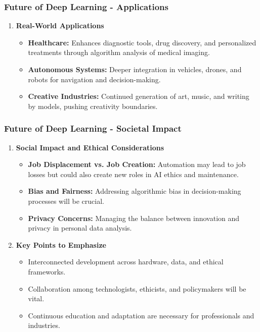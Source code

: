 \documentclass[aspectratio=169]{beamer}
\begin{document}
\begin{frame}[fragile]
    \frametitle{Future of Deep Learning - Applications}
    \begin{enumerate}[resume]
        \item \textbf{Real-World Applications}
            \begin{itemize}
                \item \textbf{Healthcare:} Enhances diagnostic tools, drug discovery, and personalized treatments through algorithm analysis of medical imaging.
                \item \textbf{Autonomous Systems:} Deeper integration in vehicles, drones, and robots for navigation and decision-making.
                \item \textbf{Creative Industries:} Continued generation of art, music, and writing by models, pushing creativity boundaries.
            \end{itemize}
    \end{enumerate}
\end{frame}

\begin{frame}[fragile]
    \frametitle{Future of Deep Learning - Societal Impact}
    \begin{enumerate}[resume]
        \item \textbf{Social Impact and Ethical Considerations}
            \begin{itemize}
                \item \textbf{Job Displacement vs. Job Creation:} Automation may lead to job losses but could also create new roles in AI ethics and maintenance.
                \item \textbf{Bias and Fairness:} Addressing algorithmic bias in decision-making processes will be crucial.
                \item \textbf{Privacy Concerns:} Managing the balance between innovation and privacy in personal data analysis.
            \end{itemize}
        \item \textbf{Key Points to Emphasize}
            \begin{itemize}
                \item Interconnected development across hardware, data, and ethical frameworks.
                \item Collaboration among technologists, ethicists, and policymakers will be vital.
                \item Continuous education and adaptation are necessary for professionals and industries.
            \end{itemize}
    \end{enumerate}
\end{frame}
\end{document}
